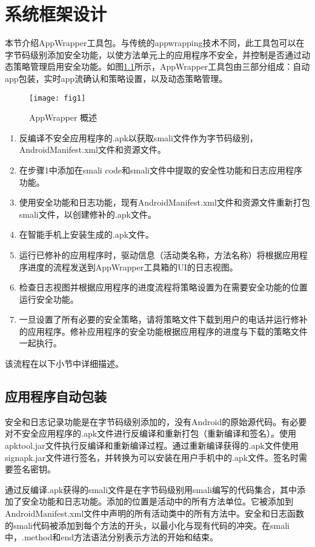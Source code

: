 \chapter{系统框架设计}

	本节介绍AppWrapper工具包。与传统的appwrapping技术不同，此工具包可以在字节码级别添加安全功能，以使方法单元上的应用程序不安全，并控制是否通过动态策略管理启用安全功能。如图\ref{fig_1}所示，AppWrapper工具包由三部分组成：自动app包装，实时app流确认和策略设置，以及动态策略管理。
	
	\begin{figure}[hbt]
		\centering
		\texttt{[image: fig1]}
		\caption{AppWrapper 概述}
		\label{fig_1}
	\end{figure}

	
	\begin{enumerate}
		\item 反编译不安全应用程序的.apk以获取smali文件作为字节码级别，AndroidManifest.xml文件和资源文件。
		\item 在步骤1中添加在smali code和smali文件中提取的安全性功能和日志应用程序功能。
		\item 使用安全功能和日志功能，现有AndroidManifest.xml文件和资源文件重新打包smali文件，以创建修补的.apk文件。
		\item 在智能手机上安装生成的.apk文件。
		\item 运行已修补的应用程序时，驱动信息（活动类名称，方法名称）将根据应用程序进度的流程发送到AppWrapper工具箱的UI的日志视图。
		\item 检查日志视图并根据应用程序的进度流程将策略设置为在需要安全功能的位置运行安全功能。
		\item 一旦设置了所有必要的安全策略，请将策略文件下载到用户的电话并运行修补的应用程序。修补应用程序的安全功能根据应用程序的进度与下载的策略文件一起执行。
	\end{enumerate}

	该流程在以下小节中详细描述。

	\section{应用程序自动包装}
		安全和日志记录功能是在字节码级别添加的，没有Android的原始源代码。有必要对不安全应用程序的.apk文件进行反编译和重新打包（重新编译和签名）。使用apktool.jar文件执行反编译和重新编译过程。通过重新编译获得的.apk文件使用signapk.jar文件进行签名，并转换为可以安装在用户手机中的.apk文件。签名时需要签名密钥。

		通过反编译.apk获得的smali文件是在字节码级别用smali编写的代码集合，其中添加了安全功能和日志功能。添加的位置是活动中的所有方法单位。它被添加到AndroidManifest.xml文件中声明的所有活动类中的所有方法中。安全和日志函数的smali代码被添加到每个方法的开头，以最小化与现有代码的冲突。在smali中，.method和end方法语法分别表示方法的开始和结束。

